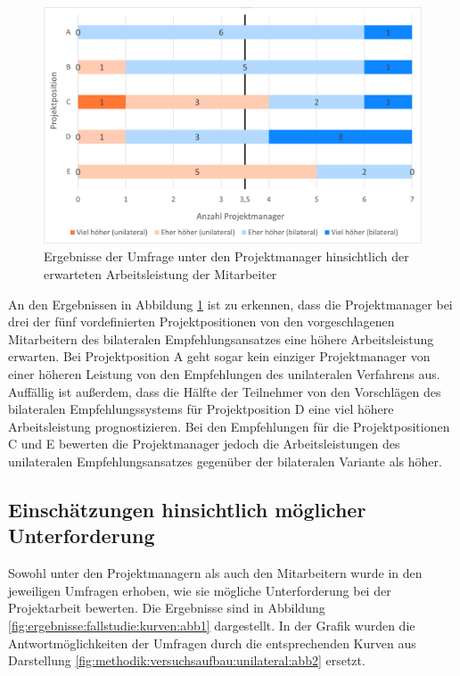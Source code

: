 \begin{figure}[h]
	\centering
	\includegraphics[width=1\textwidth]{gfx/ergebnisse-projektmanager-arbeitsleistung.png}	
	\caption{Ergebnisse der Umfrage unter den Projektmanager hinsichtlich der erwarteten Arbeitsleistung der Mitarbeiter}
	\label{fig:ergebnisse:fallstudie:arbeitsleistung:abb1}
\end{figure}

An den Ergebnissen in Abbildung \ref{fig:ergebnisse:fallstudie:arbeitsleistung:abb1} ist zu erkennen, dass die Projektmanager bei drei der fünf vordefinierten Projektpositionen von den vorgeschlagenen Mitarbeitern des bilateralen Empfehlungsansatzes eine höhere Arbeitsleistung erwarten. Bei Projektposition A geht sogar kein einziger Projektmanager von einer höheren Leistung von den Empfehlungen des unilateralen Verfahrens aus. Auffällig ist außerdem, dass die Hälfte der Teilnehmer von den Vorschlägen des bilateralen Empfehlungssystems für Projektposition D eine viel höhere Arbeitsleistung prognostizieren. Bei den Empfehlungen für die Projektpositionen C und E bewerten die Projektmanager jedoch die Arbeitsleistungen des unilateralen Empfehlungsansatzes gegenüber der bilateralen Variante als höher.
\newpage
\subsection{Einschätzungen hinsichtlich möglicher Unterforderung}
\label{ch:ergebnisse:fallstudie:kurven}
Sowohl unter den Projektmanagern als auch den Mitarbeitern wurde in den jeweiligen Umfragen erhoben, wie sie mögliche Unterforderung bei der Projektarbeit bewerten. Die Ergebnisse sind in Abbildung \ref{fig:ergebnisse:fallstudie:kurven:abb1} dargestellt. In der Grafik wurden die Antwortmöglichkeiten der Umfragen durch die entsprechenden Kurven aus Darstellung \ref{fig:methodik:versuchsaufbau:unilateral:abb2} ersetzt.

